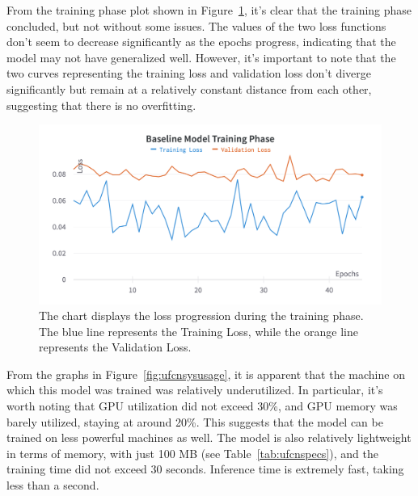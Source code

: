 From the training phase plot shown in Figure~\ref{fig:ufcntraining}, it's clear that the training phase concluded, but not without some issues. The values of the two loss functions don't seem to decrease significantly as the epochs progress, indicating that the model may not have generalized well. However, it's important to note that the two curves representing the training loss and validation loss don't diverge significantly but remain at a relatively constant distance from each other, suggesting that there is no overfitting.




\begin{figure}[]
	\centering
	\includegraphics[width=\textwidth]{chapters/3_models/imgs/ufnc/ufnctraining.png}
	\caption{The chart displays the loss progression during the training phase. The blue line represents the Training Loss, while the orange line represents the Validation Loss.}
	\label{fig:ufcntraining}
\end{figure}

From the graphs in Figure~\ref{fig:ufcnsysusage}, it is apparent that the
machine on which this model was trained was relatively underutilized.
In particular, it's worth noting that GPU utilization did not exceed 30\%,
and GPU memory was barely utilized, staying at around 20\%.
This suggests that the model can be trained on less powerful machines as well.
The model is also relatively lightweight in terms of memory,
with just 100 MB (see Table~\ref{tab:ufcnspecs}), and the training time
did not exceed 30 seconds.
Inference time is extremely fast, taking less than a second.


